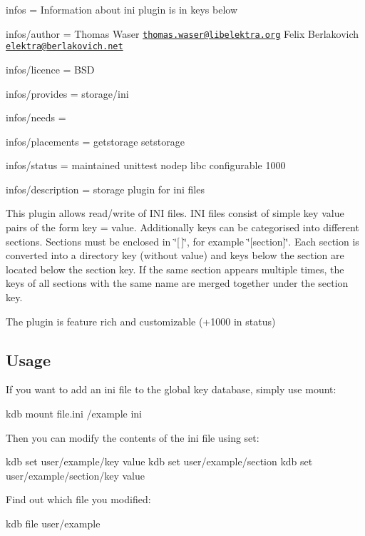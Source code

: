 
\begin{DoxyItemize}
\item infos = Information about ini plugin is in keys below
\item infos/author = Thomas Waser \href{mailto:thomas.waser@libelektra.org}{\tt thomas.\+waser@libelektra.\+org} Felix Berlakovich \href{mailto:elektra@berlakovich.net}{\tt elektra@berlakovich.\+net}
\item infos/licence = B\+S\+D
\item infos/provides = storage/ini
\item infos/needs =
\item infos/placements = getstorage setstorage
\item infos/status = maintained unittest nodep libc configurable 1000
\item infos/description = storage plugin for ini files
\end{DoxyItemize}

This plugin allows read/write of I\+N\+I files. I\+N\+I files consist of simple key value pairs of the form {\ttfamily key = value}. Additionally keys can be categorised into different sections. Sections must be enclosed in \char`\"{}\mbox{[}$\,$\mbox{]}\char`\"{}, for example \char`\"{}\mbox{[}section\mbox{]}\char`\"{}. Each section is converted into a directory key (without value) and keys below the section are located below the section key. If the same section appears multiple times, the keys of all sections with the same name are merged together under the section key.

The plugin is feature rich and customizable (+1000 in status)

\subsection*{Usage}

If you want to add an ini file to the global key database, simply use mount\+: \begin{DoxyVerb}kdb mount file.ini /example ini
\end{DoxyVerb}


Then you can modify the contents of the ini file using set\+: \begin{DoxyVerb}kdb set user/example/key value
kdb set user/example/section
kdb set user/example/section/key value
\end{DoxyVerb}


Find out which file you modified\+: \begin{DoxyVerb}kdb file user/example
\end{DoxyVerb}


